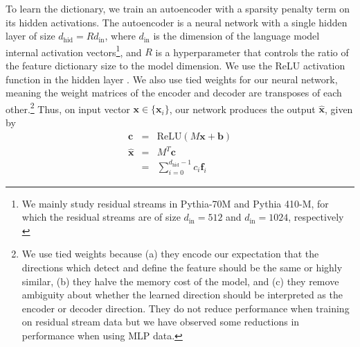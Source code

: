 To learn the dictionary, we train an autoencoder with a sparsity penalty term on its hidden activations. The autoencoder is a neural network with a single hidden layer of size $d_{\text{hid}}=R d_{\text{in}}$, where $d_{\text{in}}$ is the dimension of the language model internal activation vectors\footnote{We mainly study residual streams in Pythia-70M and Pythia 410-M, for which the residual streams are of size $d_{\text{in}}=512$ and $d_{\text{in}}=1024$, respectively \citep{biderman2023pythia}}, and $R$ is a hyperparameter that controls the ratio of the feature dictionary size to the model dimension. We use the ReLU activation function in the hidden layer \citep{fukushima1975relu}. We also use tied weights for our neural network, meaning the weight matrices of the encoder and decoder are transposes of each other.\footnote{We use tied weights because (a) they encode our expectation that the directions which detect and define the feature should be the same or highly similar, (b) they halve the memory cost of the model, and 
(c) they remove ambiguity about whether the learned direction should be interpreted as the encoder or decoder direction. They do not reduce performance when training on residual stream data but we have observed some reductions in performance when using MLP data.}  Thus, on input vector $\mathbf{x} \in \{\mathbf{x}_i\}$, our network produces the output $\mathbf{\hat x}$, given by
\begin{eqnarray}
\mathbf{c} &=& \mathrm{ReLU}(M\mathbf{x}+\mathbf{b}) \label{eq:encoder}\\
\mathbf{\hat x} &=& M^T \mathbf{c} \label{eq:decoder}\\
&=& \sum_{i = 0}^{d_{\text{hid}}-1} c_i \mathbf{f}_i
\end{eqnarray}

